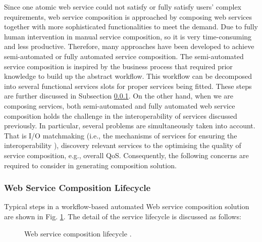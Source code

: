 Since one atomic web service could not satisfy or fully satisfy users' complex requirements, web service composition is approached by composing web services together with more sophisticated functionalities to meet the demand. Due to fully human intervention in manual service composition, so it is very time-consuming and less productive. Therefore, many approaches have been developed to achieve semi-automated or fully automated service composition. The semi-automated service composition is inspired by the business process that required prior knowledge to build up the abstract workflow. This workflow can be decomposed into several functional services slots for proper services being fitted. These steps are further discussed in Subsection \ref{lifecycle}. On the other hand, when we are composing services, both semi-automated and fully automated web service composition holds the challenge in the interoperability of services discussed previously. In particular, several problems are simultaneously taken into account. That is I/O matchmaking (i.e., the mechanisms of services for ensuring the interoperability ), discovery relevant services to the optimising the quality of service composition, e.g., overall QoS. Consequently, the following concerns are required to consider in generating composition solution. 


\subsubsection{Web Service Composition Lifecycle}\label{lifecycle}
Typical steps in a workflow-based automated Web service composition solution are shown in Fig. \ref{fig:lifecycle}. The detail of the service lifecycle is discussed as follows:

\begin{figure}
\centerline{
}
\caption{ Web service composition lifecycle \cite{moghaddam2014service}.}
\label{fig:lifecycle}
\end{figure}


